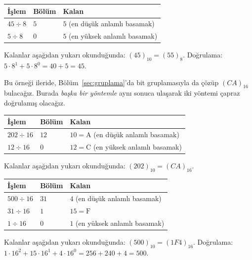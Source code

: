 \begin{ornek}
\begin{center}
\begin{tabular}{lll}
\toprule
İşlem & Bölüm & Kalan \\
\midrule
$45 \div 8$ & $5$ & $5$ (en düşük anlamlı basamak) \\
$5 \div 8$ & $0$ & $5$ (en yüksek anlamlı basamak) \\
\bottomrule
\end{tabular}
\end{center}
Kalanlar aşağıdan yukarı okunduğunda: $(45)_{10}=(55)_8$. Doğrulama:
$5\cdot8^1+5\cdot8^0=40+5=45$. \checkmark
\end{ornek}

\begin{ornek}
Bu örneği ileride, Bölüm~\ref{sec:gruplama}'da bit gruplamasıyla da çözüp $(CA)_{16}$
bulacağız. Burada \emph{başka bir yöntemle} aynı sonuca ulaşarak iki yöntemi çapraz
doğrulamış olacağız.
\begin{center}
\begin{tabular}{lll}
\toprule
İşlem & Bölüm & Kalan \\
\midrule
$202 \div 16$ & $12$ & $10=\text{A}$ (en düşük anlamlı basamak) \\
$12 \div 16$ & $0$ & $12=\text{C}$ (en yüksek anlamlı basamak) \\
\bottomrule
\end{tabular}
\end{center}
Kalanlar aşağıdan yukarı okunduğunda: $(202)_{10}=(CA)_{16}$.
\end{ornek}

\begin{ornek}
\begin{center}
\begin{tabular}{lll}
\toprule
İşlem & Bölüm & Kalan \\
\midrule
$500 \div 16$ & $31$ & $4$ (en düşük anlamlı basamak) \\
$31 \div 16$ & $1$ & $15=\text{F}$ \\
$1 \div 16$ & $0$ & $1$ (en yüksek anlamlı basamak) \\
\bottomrule
\end{tabular}
\end{center}
Kalanlar aşağıdan yukarı okunduğunda: $(500)_{10}=(1F4)_{16}$. Doğrulama:
$1\cdot16^2+15\cdot16^1+4\cdot16^0=256+240+4=500$. \checkmark
\end{ornek}

